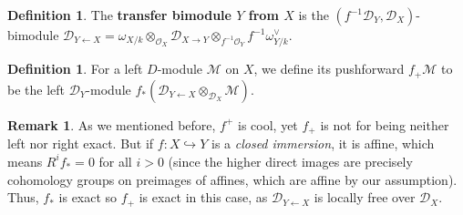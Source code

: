 \documentclass[11pt, a4paper]{article}
\theoremstyle{definition}
\newtheorem{remark}[theorem]{Remark}
\newtheorem{definition}[theorem]{Definition}
\newcommand{\w}[0]{\omega}
\begin{document}
    \begin{definition}
        The \textbf{transfer bimodule $Y$ from $X$} is the $(f^{-1}\mathcal D_Y, \mathcal D_X)$-bimodule $\mathcal D_{Y\leftarrow X}=\w_{X/k}\otimes_{\mathcal O_X}\mathcal D_{X\to Y}\otimes_{f^{-1}\mathcal O_Y}f^{-1}\w_{Y/k}^\vee$.
    \end{definition}
    \begin{definition}
        For a left $D$-module $\mathcal M$ on $X$, we define its pushforward $f_+\mathcal M$ to be the left $\mathcal D_Y$-module $f_*(\mathcal D_{Y\leftarrow X}\otimes_{\mathcal D_X}\mathcal M)$.
    \end{definition}
    \begin{remark}\label{rmk-push-closed-imm}
        As we mentioned before, $f^+$ is cool, yet $f_+$ is not for being neither left nor right exact. But if $f:X\hookrightarrow Y$ is a \textit{closed immersion}, it is affine, which means $R^if_*=0$ for all $i>0$ (since the higher direct images are precisely cohomology groups on preimages of affines, which are affine by our assumption). Thus, $f_*$ is exact so $f_+$ is exact in this case, as $\mathcal D_{Y\leftarrow X}$ is locally free over $\mathcal D_X$.
    \end{remark}
\end{document}
